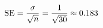 \documentclass[preview]{standalone}
\begin{document}
\begin{align*}
\special{dvisvgm:raw <g id='unique000'>}\text{SE}=\frac{\sigma}{\sqrt{n}}=\frac{1}{\sqrt{30}}\approx 0.183\special{dvisvgm:raw </g>}
\end{align*}
\end{document}

